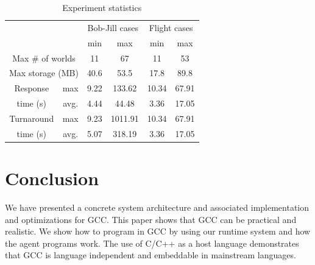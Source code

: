 \documentclass[preprint,10pt]{sigplanconf}
\begin{document}
\begin{table}
\begin{center}
\begin{tabular}{c|c||c|c|c|c}
  \hline
  \multicolumn{2}{c||}{}
    & \multicolumn{2}{c}{Bob-Jill cases} & \multicolumn{2}{|c}{Flight cases} \\
    \cline{3-6}
  \multicolumn{2}{c||}{}
     & min & max & min & max \\
  \hline
  \multicolumn{2}{c||}{Max \# of worlds}
    & 11 & 67 & 11 & 53 \\
  \hline
  \multicolumn{2}{c||}{Max storage (MB)}
    & 40.6 & 53.5 & 17.8 & 89.8 \\
  \hline
    Response
    & max
    & 9.22 & 133.62 & 10.34 & 67.91 \\
  \cline{2-6}
    time (s)
    & avg.
    & 4.44 & 44.48 & 3.36 & 17.05 \\
  \hline
    Turnaround
    & max
    & 9.23 & 1011.91 & 10.34 & 67.91 \\
  \cline{2-6}
    time (s)
    & avg.
    & 5.07 & 318.19 & 3.36 & 17.05 \\
  \hline
\end{tabular}
\end{center}
\vspace{-3mm}
\caption{Experiment statistics}
\label{result_bobjill}
\end{table}


\section{Conclusion}  %

We have presented a concrete system architecture 
  and associated implementation and optimizations for GCC. 
This paper shows that GCC can be practical and realistic.
We show how to program in GCC by using our
  runtime system and how the agent programs work. 
The use of C/C++ as a host language demonstrates that 
GCC is language independent and embeddable in
mainstream languages. 

%
%
%






\end{document}
